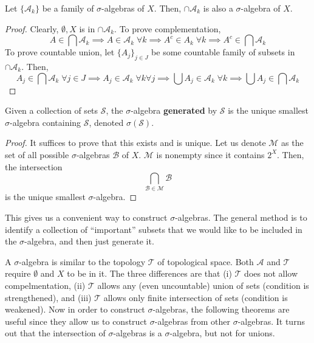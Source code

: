   \begin{lemma}
    \label{thm:intersection-of-sigma-algebras-is-a-sigma}
    Let $\{\mathcal{A}_k\}$ be a family of $\sigma$-algebras of $X$. Then, $\cap \mathcal{A}_k$ is also a $\sigma$-algebra of $X$. 
  \end{lemma}
  \begin{proof}
    Clearly, $\emptyset, X$ is in $\cap \mathcal{A}_k$. To prove complementation, 
    \begin{equation}
      A \in \bigcap \mathcal{A}_k \implies A \in \mathcal{A}_k \; \forall k \implies A^c \in A_k \; \forall k \implies A^c \in \bigcap \mathcal{A}_k
    \end{equation}
    To prove countable union, let $\{A_j\}_{j \in J}$ be some countable family of subsets in $\cap \mathcal{A}_k$. Then, 
    \begin{equation}
      A_j \in \bigcap \mathcal{A}_k \; \forall j \in J \implies A_j \in \mathcal{A}_k \; \forall k \forall j \implies \bigcup A_j \in \mathcal{A}_k \; \forall k \implies \bigcup A_j \in \bigcap \mathcal{A}_k
    \end{equation}
  \end{proof}

  \begin{definition}
    \label{def:sigma-algebra-generated-by-a-set}
    Given a collection of sets $\mathcal{S}$, the $\sigma$-algebra \textbf{generated} by $\mathcal{S}$ is the unique smallest $\sigma$-algebra containing $\mathcal{S}$, denoted $\sigma(\mathcal{S})$. 
  \end{definition} 
	\begin{proof}
    It suffices to prove that this exists and is unique. Let us denote $\mathcal{M}$ as the set of all possible $\sigma$-algebras $\mathcal{B}$ of $X$. $\mathcal{M}$ is nonempty since it contains $2^X$. Then, the intersection 
    \begin{equation}
      \bigcap_{\mathcal{B} \in \mathcal{M}} \mathcal{B}
    \end{equation}
    is the unique smallest $\sigma$-algebra. 
	\end{proof}

  This gives us a convenient way to construct $\sigma$-algebras. The general method is to identify a collection of ``important'' subsets that we would like to be included in the $\sigma$-algebra, and then just generate it.   

  A $\sigma$-algebra is similar to the topology $\mathscr{T}$ of topological space. Both $\mathcal{A}$ and $\mathscr{T}$ require $\emptyset$ and $X$ to be in it. The three differences are that (i) $\mathscr{T}$ does not allow compelmentation, (ii) $\mathscr{T}$ allows any (even uncountable) union of sets (condition is strengthened), and (iii) $\mathscr{T}$ allows only finite intersection of sets (condition is weakened). Now in order to construct $\sigma$-algebras, the following theorems are useful since they allow us to construct $\sigma$-algebras from other $\sigma$-algebras. It turns out that the intersection of $\sigma$-algebras is a $\sigma$-algebra, but not for unions. 

